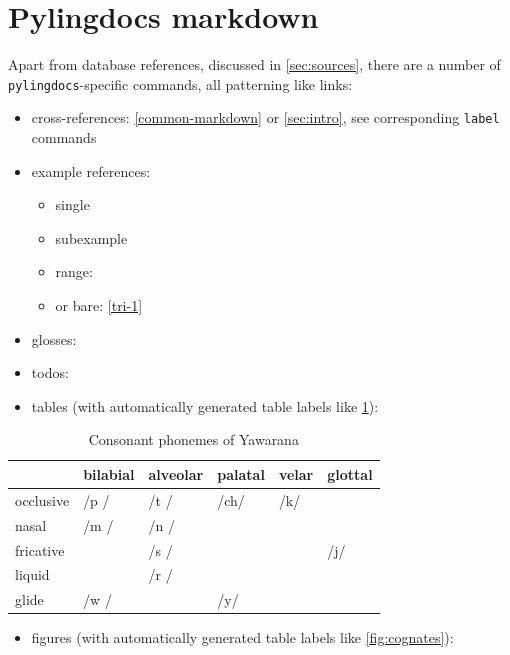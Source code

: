 \documentclass{article}
\begin{document}
\section{\texorpdfstring{Pylingdocs markdown
\label{pld-md}}{Pylingdocs markdown }}

Apart from database references, discussed in \cref{sec:sources}, there
are a number of \texttt{pylingdocs}-specific commands, all patterning
like links:

\begin{itemize}
\tightlist
\item
  cross-references: \cref{common-markdown} or \cref{sec:intro}, see
  corresponding \texttt{label} commands
\item
  example references:

  \begin{itemize}
  \tightlist
  \item
    single 
  \item
    subexample 
  \item
    range: 
  \item
    or bare: \ref{tri-1}
  \end{itemize}
\item
  glosses: 
\item
  todos:
\item
  tables (with automatically generated table labels like
  \cref{tab:consonants}):
\end{itemize}

\begin{table}
\caption{Consonant phonemes of Yawarana}
\label{tab:consonants}
\centering
\begin{tabular}{llllll}
\toprule
 & bilabial & alveolar & palatal & velar & glottal \\
\midrule
occlusive & /p / & /t / & /ch/ & /k/ &  \\
nasal & /m / & /n / &  &  &  \\
fricative &  & /s / &  &  & /j/ \\
liquid &  & /r / &  &  &  \\
glide & /w / &  & /y/ &  &  \\
\bottomrule
\end{tabular}

\end{table}

\begin{itemize}
\tightlist
\item
  figures (with automatically generated table labels like
  \cref{fig:cognates}):
\end{itemize}
\end{document}
